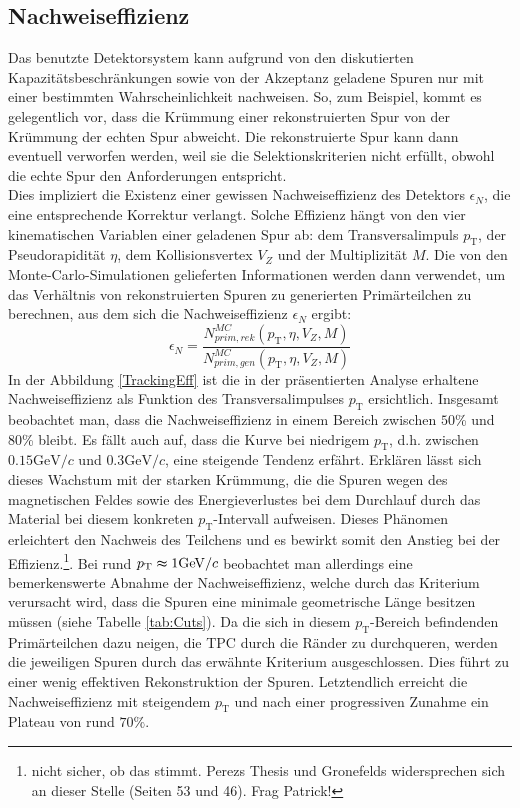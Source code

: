 \documentclass[12pt,a4paper]{report}
\begin{document}
\subsection{Nachweiseffizienz}
Das benutzte Detektorsystem kann aufgrund von den diskutierten Kapazitätsbeschränkungen sowie von der Akzeptanz geladene Spuren nur mit einer bestimmten Wahrscheinlichkeit nachweisen. So, zum Beispiel, kommt es gelegentlich vor, dass die Krümmung einer rekonstruierten Spur von der Krümmung der echten Spur abweicht. Die rekonstruierte Spur kann dann eventuell verworfen werden, weil sie die Selektionskriterien nicht erfüllt, obwohl die echte Spur den Anforderungen entspricht.\\
Dies impliziert die Existenz einer gewissen Nachweiseffizienz des Detektors $\epsilon_{N}$, die eine entsprechende Korrektur verlangt. Solche Effizienz hängt von den vier kinematischen Variablen einer geladenen Spur ab: dem Transversalimpuls $p_{\mathrm{T}}$, der Pseudorapidität $\eta$, dem Kollisionsvertex $V_{Z}$ und der Multiplizität $M$. Die von den Monte-Carlo-Simulationen gelieferten Informationen werden dann verwendet, um das Verhältnis von rekonstruierten Spuren zu generierten Primärteilchen zu berechnen, aus dem sich die Nachweiseffizienz $\epsilon_{N}$ ergibt:
\begin{equation} \label{eq:TrackingEff}
  \epsilon_{N}=\dfrac{N^{MC}_{prim,rek}(p_{\mathrm{T}}, \eta, V_{Z}, M)}{N^{MC}_{prim,gen}(p_{\mathrm{T}}, \eta, V_{Z}, M)}
\end{equation}
In der Abbildung \ref{TrackingEff} ist die in der präsentierten Analyse erhaltene Nachweiseffizienz als Funktion des Transversalimpulses $p_{\mathrm{T}}$ ersichtlich. Insgesamt beobachtet man, dass die Nachweiseffizienz in einem Bereich zwischen $50$\% und  $80$\% bleibt. Es fällt auch auf, dass die Kurve bei niedrigem $p_{\mathrm{T}}$, d.h. zwischen $0.15 \mathrm{GeV}/c$ und $0.3 \mathrm{GeV}/c$, eine steigende Tendenz erfährt. Erklären lässt sich dieses Wachstum mit der starken Krümmung, die die Spuren wegen des magnetischen Feldes sowie des Energieverlustes bei dem Durchlauf durch das Material bei diesem konkreten $p_{\mathrm{T}}$-Intervall aufweisen. Dieses Phänomen erleichtert den Nachweis des Teilchens und es bewirkt somit den Anstieg bei der Effizienz.\footnote{nicht sicher, ob das stimmt. Perezs Thesis und Gronefelds widersprechen sich an dieser Stelle (Seiten 53 und 46). Frag Patrick!}. Bei rund $p_{\mathrm{T}} \thickapprox 1 \mathrm{GeV}/c$ beobachtet man allerdings eine bemerkenswerte Abnahme der Nachweiseffizienz, welche durch das Kriterium verursacht wird, dass die Spuren eine minimale geometrische Länge besitzen müssen (siehe Tabelle \ref{tab:Cuts}). Da die sich in diesem $p_{\mathrm{T}}$-Bereich befindenden Primärteilchen dazu neigen, die TPC durch die Ränder zu durchqueren, werden die jeweiligen Spuren durch das erwähnte Kriterium ausgeschlossen. Dies führt zu einer wenig effektiven Rekonstruktion der Spuren. Letztendlich erreicht die Nachweiseffizienz mit steigendem $p_{\mathrm{T}}$ und nach einer progressiven Zunahme ein Plateau von rund $70\%$.
\end{document}
